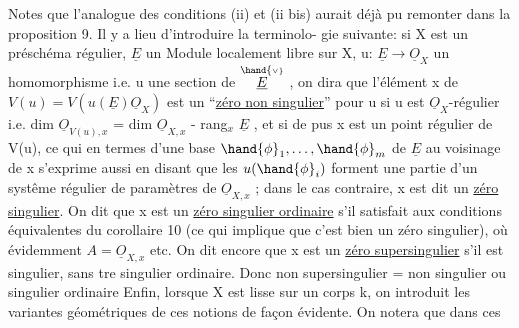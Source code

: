 \placedmargin{$\Vert$} Notes que l'analogue des conditions (ii) et (ii bis) aurait déjà
pu remonter dans la proposition 9. Il y a lieu d'introduire la terminolo-%
gie suivante: si X est un préschéma régulier, $\underline{E}$ un Module localement libre
 sur X, u: $\underline{E}\to\underline{O}_X$ un homomorphisme i.e. u une section de
$\overset{\hand{\scriptscriptstyle\vee}}{\underline{E}}$ , on dira que l'élément x de $V(u)=V(u(\underline{E})\underline{O}_X)$ est un 
``\uline{zéro non singulier}'' pour u\hand{,} si u est $\underline{O}_X$-régulier i.e. dim $\underline{O}_{V(u),x}$
= dim $\underline{O}_{X,x}$ - rang$_x$ $\underline{E}$ , et si de pus x est un point régulier de V(u),
ce qui en termes d'une base $\hand{\phi}_1,\ldots,\hand{\phi}_m$ de $\underline{E}$ au voisinage de x s'exprime
aussi en disant que les $u(\hand{\phi}_i)$ forment une partie d'un systême régulier
de paramètres de $\underline{O}_{X,x}$ ; dans le cas contraire, x est dit un \uline{zéro}
\uline{singulier}. On dit que x est un \uline{zéro singulier ordinaire} s'il satisfait
aux conditions équivalentes du corollaire 10 (ce qui implique que c'est
bien un zéro singulier), où évidemment $A=\underline{O}_{X,x}$ etc. On dit encore que
x est un \uline{zéro supersingulier} s'il est singulier, sans \hand{\^{\textcolor{black}{e}}}tre singulier
ordinaire. Donc non supersingulier\placedmargin{\unsure{$\smallsmile$}} = non singulier ou singulier ordinaire
Enfin, lorsque X est lisse sur un corps k, on introduit les variantes
géométriques de ces notions de façon évidente. On notera que dans ces


